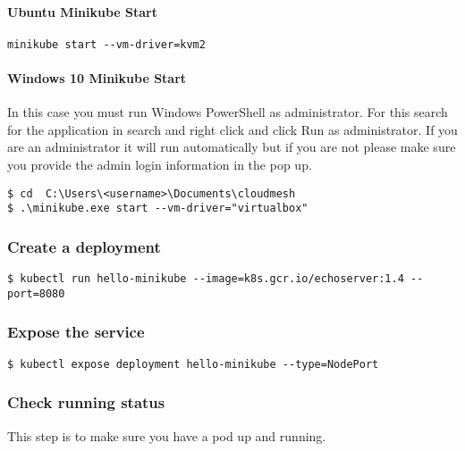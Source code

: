 \paragraph{Ubuntu Minikube Start}\label{ubuntu-minikube-start}

\begin{verbatim}
minikube start --vm-driver=kvm2
\end{verbatim}

\paragraph{Windows 10 Minikube Start}\label{windows-10-minikube-start}

In this case you must run Windows PowerShell as administrator. For
this search for the application in search and right click and click Run
as administrator. If you are an administrator it will run automatically
but if you are not please make sure you provide the admin login
information in the pop up.

\begin{verbatim}
$ cd  C:\Users\<username>\Documents\cloudmesh
$ .\minikube.exe start --vm-driver="virtualbox"
\end{verbatim}

\subsubsection{Create a deployment}\label{create-a-deployment}

\begin{verbatim}
$ kubectl run hello-minikube --image=k8s.gcr.io/echoserver:1.4 --port=8080
\end{verbatim}

\subsubsection{Expose the service}\label{expose-the-service}

\begin{verbatim}
$ kubectl expose deployment hello-minikube --type=NodePort
\end{verbatim}

\subsubsection{Check running status}\label{check-running-status}

This step is to make sure you have a pod up and running.

